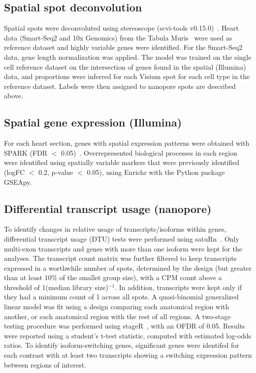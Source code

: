 \documentclass[utf8]{FrontiersinHarvard} %
\begin{document}
\subsection*{Spatial spot deconvolution}
Spatial spots were deconvoluted using stereoscope (scvi-tools v0.15.0)~\citep{Andersson2020:stereoscope}. Heart data (Smart-Seq2 and 10x Genomics) from the Tabula Muris~\citep{Schaum2018:Tabula_muris} were used as reference dataset and highly variable genes were identified. For the Smart-Seq2 data, gene length normalization was applied. The model was trained on the single cell reference dataset on the intersection of genes found in the spatial (Illumina) data, and proportions were inferred for each Visium spot for each cell type in the reference dataset. Labels were then assigned to nanopore spots are described above.

\subsection*{Spatial gene expression (Illumina)}
For each heart section, genes with spatial expression patterns were obtained with SPARK (FDR $<$ 0.05)~\citep{Sun2020:spark}. 
Overrepresented biological processes in each region were identified using spatially variable markers that were previously identified (logFC $<$ 0.2, p-value $<$ 0.05), using
Enrichr with the Python package GSEApy.

\subsection*{Differential transcript usage (nanopore)}
To identify changes in relative usage of transcripts/isoforms within genes, differential transcript usage (DTU) tests were performed using satuRn~\citep{Gilis2021:satuRn}. Only multi-exon transcripts and genes with more than one isoform were kept for the analyses. The transcript count matrix was further filtered to keep transcripts expressed in a worthwhile number of spots, determined by the design (but greater than at least 10\% of the smallet group size), with a CPM count above a threshold of 1(median library size)$^{-1}$. In addition, transcripts were kept only if they had a minimum count of 1 across all spots. A quasi-binomial generalized linear model was fit using a design comparing each anatomical region with another, or each anatomical region with the rest of all regions. A two-stage testing procedure was performed using stageR~\citep{R:stageR}, with an OFDR of 0.05. Results were reported using a student's t-test statistic, computed with estimated log-odds ratios.
To identify isoform-switching genes, significant genes were identifed for each contrast with at least two transcripts showing a switching expression pattern between regions of interest.
\end{document}
